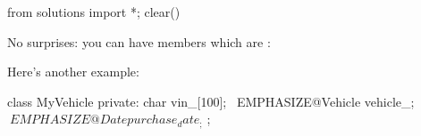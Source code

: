 \begin{python0}
from solutions import *; clear()
\end{python0}

No surprises: you can have members which are :


Here's another example:

\begin{console}[commandchars=\~\@\$]
class MyVehicle
{     
private:
        char vin_[100];
        ~EMPHASIZE@Vehicle vehicle_;$
        ~EMPHASIZE@Date purchase_date_;$
};
\end{console}

